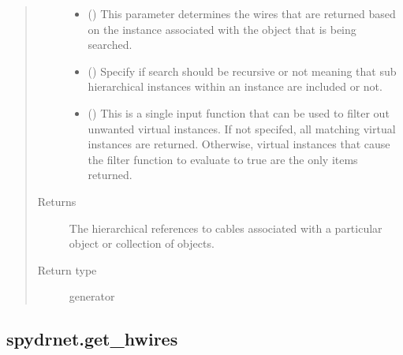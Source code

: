 \documentclass[letterpaper,10pt,english,openany,oneside]{sphinxmanual}
\begin{document}
\begin{fulllineitems}
\begin{quote}
\begin{description}
\begin{itemize}
\item {} 
 () \textendash{} This parameter determines the wires that are returned based on the instance associated with the object that is
being searched.

\item {} 
 () \textendash{} Specify if search should be recursive or not meaning that sub hierarchical instances within an instance are
included or not.

\item {} 
 () \textendash{} This is a single input function that can be used to filter out unwanted virtual instances. If not specifed, all
matching virtual instances are returned. Otherwise, virtual instances that cause the filter function to evaluate
to true are the only items returned.

\end{itemize}

\item[{Returns}] \leavevmode
{} \textendash{} The hierarchical references to cables associated with a particular object or collection of objects.

\item[{Return type}] \leavevmode
generator

\end{description}\end{quote}

\end{fulllineitems}



\subsection{spydrnet.get\_hwires}
\label{\detokenize{reference/classes/generated/spydrnet.get_hwires:spydrnet-get-hwires}}\label{\detokenize{reference/classes/generated/spydrnet.get_hwires::doc}}
\end{document}
